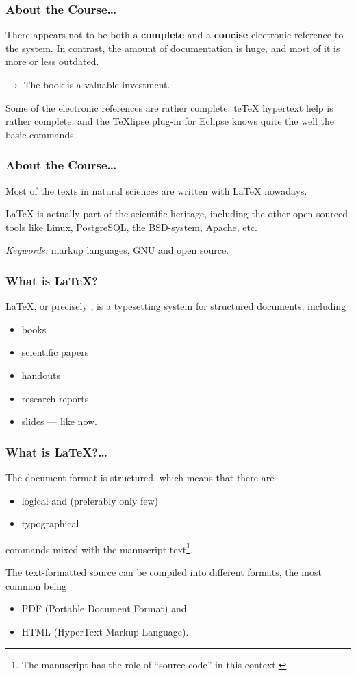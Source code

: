 \documentclass[13pt]{beamer}
\begin{document}
\begin{frame}\frametitle{About the Course\dots}
There appears not to be both a \textbf{complete} and a \textbf{concise}
electronic reference to the system. In contrast, the amount of documentation
is huge, and most of it is more or less
outdated.\bigskip

$\to$ The book is a valuable investment.\bigskip

Some of the electronic references are rather complete: teTeX 
hypertext help is rather complete, and the TeXlipse plug-in for Eclipse knows
quite the well the basic commands.
\end{frame}

\begin{frame}\frametitle{About the Course\dots}
Most of the texts in natural sciences are written with \LaTeX{} 
nowadays.\bigskip

\LaTeX{} is actually part of the scientific heritage, including the
other open sourced tools like Linux, PostgreSQL, the BSD-system, Apache,
etc. 
\bigskip

\emph{Keywords:} markup languages, GNU and open source.
\end{frame}


\begin{frame}\frametitle{What is \LaTeX{}?}
\LaTeX{}, or precisely \LaTeXe{}, is a typesetting system for structured
documents, including

\begin{itemize}
  \item books
  \item scientific papers
  \item handouts
  \item research reports
  \item slides --- like now.
\end{itemize}
\end{frame}


\begin{frame}\frametitle{What is \LaTeX{}?\dots}
The document format is structured, which means that there are
\begin{itemize}
  \item logical and (preferably only few) %
  \item typographical %
\end{itemize}
commands mixed with the manuscript text\footnote{The manuscript  has the role
of ``source code'' in this context.}.\bigskip

The text-formatted source can be compiled into
different formats, the most common being
\begin{itemize}
  \item PDF (Portable Document Format) and
  \item HTML (HyperText Markup Language).
\end{itemize}
\end{frame}
\end{document}
